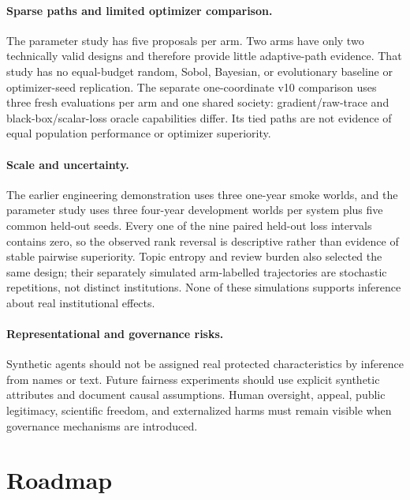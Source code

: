 \documentclass{article}
\begin{document}
\paragraph{Sparse paths and limited optimizer comparison.} The parameter study has five proposals per arm. Two arms have only two technically valid designs and therefore provide little adaptive-path evidence. That study has no equal-budget random, Sobol, Bayesian, or evolutionary baseline or optimizer-seed replication. The separate one-coordinate v10 comparison uses three fresh evaluations per arm and one shared society: gradient/raw-trace and black-box/scalar-loss oracle capabilities differ. Its tied paths are not evidence of equal population performance or optimizer superiority.

\paragraph{Scale and uncertainty.} The earlier engineering demonstration uses three one-year smoke worlds, and the parameter study uses three four-year development worlds per system plus five common held-out seeds. Every one of the nine paired held-out loss intervals contains zero, so the observed rank reversal is descriptive rather than evidence of stable pairwise superiority. Topic entropy and review burden also selected the same design; their separately simulated arm-labelled trajectories are stochastic repetitions, not distinct institutions. None of these simulations supports inference about real institutional effects.

\paragraph{Representational and governance risks.} Synthetic agents should not be assigned real protected characteristics by inference from names or text. Future fairness experiments should use explicit synthetic attributes and document causal assumptions. Human oversight, appeal, public legitimacy, scientific freedom, and externalized harms must remain visible when governance mechanisms are introduced.

\section{Roadmap}
\end{document}
